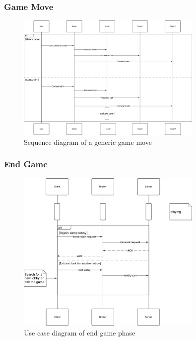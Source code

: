 \documentclass{scrartcl}
\begin{document}
\subsubsection{Game Move}\label{game-move}
\begin{figure}[H]
      \centering
      \includegraphics[width=0.8\textwidth]{figures/sequenceGameMove.png}
      \caption{Sequence diagram of a generic game move}
      \label{fig:gane-move}
\end{figure}

\subsubsection{End Game}\label{end-game}
\begin{figure}[H]
      \centering
      \includegraphics[width=0.8\textwidth]{figures/sequenceEndGame.png}
      \caption{Use case diagram of end game phase}
      \label{fig:end-game}
\end{figure}
\end{document}
